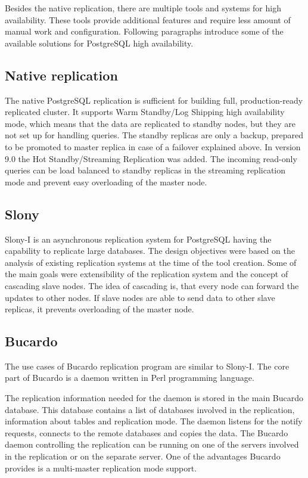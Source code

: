 \documentclass[
  digital, %
  twoside, %
  table,   %
  nolof,   %
  nolot,   %
]{fithesis3}
\begin{document}
Besides the native replication, there are multiple tools and systems for high availability. These tools provide additional features and require less amount of manual work and configuration. Following paragraphs introduce some of the available solutions for PostgreSQL high availability.

\subsection{Native replication}
The native PostgreSQL replication is sufficient for building full, production-ready replicated cluster. It supports Warm Standby/Log Shipping high availability mode, which means that the data are replicated to standby nodes, but they are not set up for handling queries. The standby replicas are only a backup, prepared to be promoted to master replica in case of a failover explained above. In version 9.0 the Hot Standby/Streaming Replication was added. The incoming read-only queries can be load balanced to standby replicas in the streaming replication mode and prevent easy overloading of the master node.

\subsection{Slony}
Slony-I \cite{slony} is an asynchronous replication system for PostgreSQL having the capability to replicate large databases. The design objectives were based on the analysis of existing replication systems at the time of the tool creation. Some of the main goals were extensibility of the replication system and the concept of cascading slave nodes. The idea of cascading is, that every node can forward the updates to other nodes. If slave nodes are able to send data to other slave replicas, it prevents overloading of the master node.

\subsection{Bucardo}
The use cases of Bucardo \cite{bucardo} replication program are similar to Slony-I. The core part of Bucardo is a daemon written in Perl \cite{perl} programming language.

The replication information needed for the daemon is stored in the main Bucardo database. This database contains a list of databases involved in the replication, information about tables and replication mode. The daemon listens for the notify requests, connects to the remote databases and copies the data. The Bucardo daemon controlling the replication can be running on one of the servers involved in the replication or on the separate server. One of the advantages Bucardo provides is a multi-master replication mode support.
\end{document}
